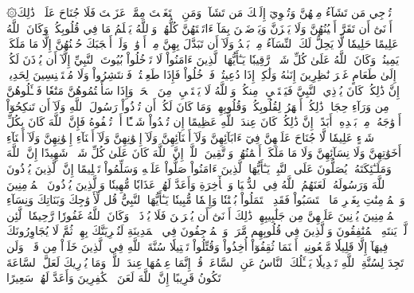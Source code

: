 ۞تُرۡجِي مَن تَشَآءُ مِنۡهُنَّ وَتُـٔۡوِيٓ إِلَيۡكَ مَن تَشَآءُۖ وَمَنِ ٱبۡتَغَيۡتَ مِمَّنۡ عَزَلۡتَ فَلَا جُنَاحَ عَلَيۡكَۚ ذَٰلِكَ أَدۡنَىٰٓ أَن تَقَرَّ أَعۡيُنُهُنَّ وَلَا يَحۡزَنَّ وَيَرۡضَيۡنَ بِمَآ ءَاتَيۡتَهُنَّ كُلُّهُنَّۚ وَٱللَّهُ يَعۡلَمُ مَا فِي قُلُوبِكُمۡۚ وَكَانَ ٱللَّهُ عَلِيمًا حَلِيمٗا
لَّا يَحِلُّ لَكَ ٱلنِّسَآءُ مِنۢ بَعۡدُ وَلَآ أَن تَبَدَّلَ بِهِنَّ مِنۡ أَزۡوَٰجٖ وَلَوۡ أَعۡجَبَكَ حُسۡنُهُنَّ إِلَّا مَا مَلَكَتۡ يَمِينُكَۗ وَكَانَ ٱللَّهُ عَلَىٰ كُلِّ شَيۡءٖ رَّقِيبٗا
يَـٰٓأَيُّهَا ٱلَّذِينَ ءَامَنُواْ لَا تَدۡخُلُواْ بُيُوتَ ٱلنَّبِيِّ إِلَّآ أَن يُؤۡذَنَ لَكُمۡ إِلَىٰ طَعَامٍ غَيۡرَ نَٰظِرِينَ إِنَىٰهُ وَلَٰكِنۡ إِذَا دُعِيتُمۡ فَٱدۡخُلُواْ فَإِذَا طَعِمۡتُمۡ فَٱنتَشِرُواْ وَلَا مُسۡتَـٔۡنِسِينَ لِحَدِيثٍۚ إِنَّ ذَٰلِكُمۡ كَانَ يُؤۡذِي ٱلنَّبِيَّ فَيَسۡتَحۡيِۦ مِنكُمۡۖ وَٱللَّهُ لَا يَسۡتَحۡيِۦ مِنَ ٱلۡحَقِّۚ وَإِذَا سَأَلۡتُمُوهُنَّ مَتَٰعٗا فَسۡـَٔلُوهُنَّ مِن وَرَآءِ حِجَابٖۚ ذَٰلِكُمۡ أَطۡهَرُ لِقُلُوبِكُمۡ وَقُلُوبِهِنَّۚ وَمَا كَانَ لَكُمۡ أَن تُؤۡذُواْ رَسُولَ ٱللَّهِ وَلَآ أَن تَنكِحُوٓاْ أَزۡوَٰجَهُۥ مِنۢ بَعۡدِهِۦٓ أَبَدًاۚ إِنَّ ذَٰلِكُمۡ كَانَ عِندَ ٱللَّهِ عَظِيمًا
إِن تُبۡدُواْ شَيۡـًٔا أَوۡ تُخۡفُوهُ فَإِنَّ ٱللَّهَ كَانَ بِكُلِّ شَيۡءٍ عَلِيمٗا
لَّا جُنَاحَ عَلَيۡهِنَّ فِيٓ ءَابَآئِهِنَّ وَلَآ أَبۡنَآئِهِنَّ وَلَآ إِخۡوَٰنِهِنَّ وَلَآ أَبۡنَآءِ إِخۡوَٰنِهِنَّ وَلَآ أَبۡنَآءِ أَخَوَٰتِهِنَّ وَلَا نِسَآئِهِنَّ وَلَا مَا مَلَكَتۡ أَيۡمَٰنُهُنَّۗ وَٱتَّقِينَ ٱللَّهَۚ إِنَّ ٱللَّهَ كَانَ عَلَىٰ كُلِّ شَيۡءٖ شَهِيدًا
إِنَّ ٱللَّهَ وَمَلَـٰٓئِكَتَهُۥ يُصَلُّونَ عَلَى ٱلنَّبِيِّۚ يَـٰٓأَيُّهَا ٱلَّذِينَ ءَامَنُواْ صَلُّواْ عَلَيۡهِ وَسَلِّمُواْ تَسۡلِيمًا
إِنَّ ٱلَّذِينَ يُؤۡذُونَ ٱللَّهَ وَرَسُولَهُۥ لَعَنَهُمُ ٱللَّهُ فِي ٱلدُّنۡيَا وَٱلۡأٓخِرَةِ وَأَعَدَّ لَهُمۡ عَذَابٗا مُّهِينٗا
وَٱلَّذِينَ يُؤۡذُونَ ٱلۡمُؤۡمِنِينَ وَٱلۡمُؤۡمِنَٰتِ بِغَيۡرِ مَا ٱكۡتَسَبُواْ فَقَدِ ٱحۡتَمَلُواْ بُهۡتَٰنٗا وَإِثۡمٗا مُّبِينٗا
يَـٰٓأَيُّهَا ٱلنَّبِيُّ قُل لِّأَزۡوَٰجِكَ وَبَنَاتِكَ وَنِسَآءِ ٱلۡمُؤۡمِنِينَ يُدۡنِينَ عَلَيۡهِنَّ مِن جَلَٰبِيبِهِنَّۚ ذَٰلِكَ أَدۡنَىٰٓ أَن يُعۡرَفۡنَ فَلَا يُؤۡذَيۡنَۗ وَكَانَ ٱللَّهُ غَفُورٗا رَّحِيمٗا
۞لَّئِن لَّمۡ يَنتَهِ ٱلۡمُنَٰفِقُونَ وَٱلَّذِينَ فِي قُلُوبِهِم مَّرَضٞ وَٱلۡمُرۡجِفُونَ فِي ٱلۡمَدِينَةِ لَنُغۡرِيَنَّكَ بِهِمۡ ثُمَّ لَا يُجَاوِرُونَكَ فِيهَآ إِلَّا قَلِيلٗا
مَّلۡعُونِينَۖ أَيۡنَمَا ثُقِفُوٓاْ أُخِذُواْ وَقُتِّلُواْ تَقۡتِيلٗا
سُنَّةَ ٱللَّهِ فِي ٱلَّذِينَ خَلَوۡاْ مِن قَبۡلُۖ وَلَن تَجِدَ لِسُنَّةِ ٱللَّهِ تَبۡدِيلٗا
يَسۡـَٔلُكَ ٱلنَّاسُ عَنِ ٱلسَّاعَةِۖ قُلۡ إِنَّمَا عِلۡمُهَا عِندَ ٱللَّهِۚ وَمَا يُدۡرِيكَ لَعَلَّ ٱلسَّاعَةَ تَكُونُ قَرِيبًا
إِنَّ ٱللَّهَ لَعَنَ ٱلۡكَٰفِرِينَ وَأَعَدَّ لَهُمۡ سَعِيرًا
